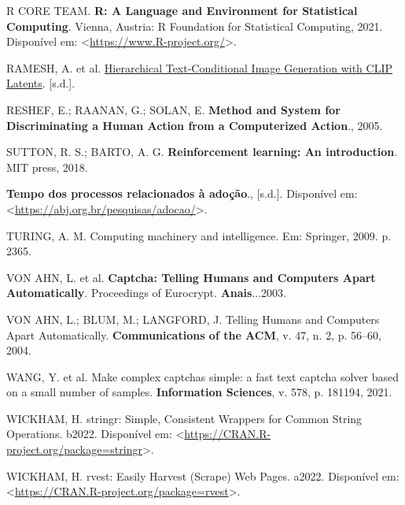 \documentclass[12pt,twoside,brazilian]{book}
\newlength{\cslhangindent}
\newlength{\cslentryspacingunit} %
\newenvironment{CSLReferences}[2] %
 {%
  \setlength{\parindent}{0pt}
  \ifodd #1
  \let\oldpar\par
  \def\par{\hangindent=\cslhangindent\oldpar}
  \fi
  \setlength{\parskip}{#2\cslentryspacingunit}
 }%
 {}
\begin{document}
\begin{CSLReferences}{0}{1}
\leavevmode{}%
R CORE TEAM. \textbf{R: A Language and Environment for Statistical
Computing}. Vienna, Austria: R Foundation for Statistical Computing,
2021. Disponível em:
\textless{}\url{https://www.R-project.org/}\textgreater.

\leavevmode{}%
RAMESH, A. et al.
\href{https://doi.org/10.48550/arXiv.2204.06125}{Hierarchical
Text-Conditional Image Generation with CLIP Latents}. {[}s.d.{]}.

\leavevmode{}%
RESHEF, E.; RAANAN, G.; SOLAN, E. \textbf{Method and System for
Discriminating a Human Action from a Computerized Action}., 2005.

\leavevmode{}%
SUTTON, R. S.; BARTO, A. G. \textbf{Reinforcement learning: An
introduction}. MIT press, 2018.

\leavevmode{}%
\textbf{Tempo dos processos relacionados à adoção}., {[}s.d.{]}.
Disponível em:
\textless{}\url{https://abj.org.br/pesquisas/adocao/}\textgreater.

\leavevmode{}%
TURING, A. M. Computing machinery and intelligence. Em: Springer, 2009.
p. 2365.

\leavevmode{}%
VON AHN, L. et al. \textbf{Captcha: {Telling} Humans and Computers Apart
Automatically}. Proceedings of Eurocrypt. \textbf{Anais}...2003.

\leavevmode{}%
VON AHN, L.; BLUM, M.; LANGFORD, J. Telling Humans and Computers Apart
Automatically. \textbf{Communications of the ACM}, v. 47, n. 2, p.
56--60, 2004.

\leavevmode{}%
WANG, Y. et al. Make complex captchas simple: a fast text captcha solver
based on a small number of samples. \textbf{Information Sciences}, v.
578, p. 181194, 2021.

\leavevmode{}%
WICKHAM, H. stringr: Simple, Consistent Wrappers for Common String
Operations. b2022. Disponível em:
\textless{}\url{https://CRAN.R-project.org/package=stringr}\textgreater.

\leavevmode{}%
WICKHAM, H. rvest: Easily Harvest (Scrape) Web Pages. a2022. Disponível
em:
\textless{}\url{https://CRAN.R-project.org/package=rvest}\textgreater.


\end{CSLReferences}
\end{document}
